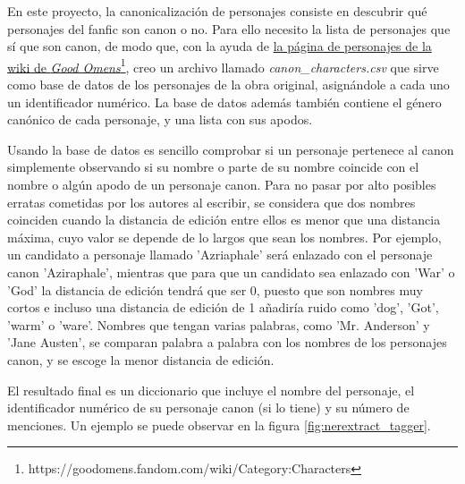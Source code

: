 \documentclass{pre-tfg}
\begin{document}
En este proyecto, la canonicalización de personajes consiste en descubrir qué personajes del fanfic son canon o no. Para ello necesito la lista de personajes que sí que son canon, de modo que, con la ayuda de \href{https://goodomens.fandom.com/wiki/Category:Characters}{la página de personajes de la wiki de \textit{Good Omens}}\footnote{https://goodomens.fandom.com/wiki/Category:Characters}, creo un archivo llamado \textit{canon\_characters.csv} que sirve como base de datos de los personajes de la obra original, asignándole a cada uno un identificador numérico. La base de datos además también contiene el género canónico de cada personaje, y una lista con sus apodos.

Usando la base de datos es sencillo comprobar si un personaje pertenece al canon simplemente observando si su nombre o parte de su nombre coincide con el nombre o algún apodo de un personaje canon. Para no pasar por alto posibles erratas cometidas por los autores al escribir, se considera que dos nombres coinciden cuando la distancia de edición \cite{levenshtein_1966} entre ellos es menor que una distancia máxima, cuyo valor se depende de lo largos que sean los nombres. Por ejemplo, un candidato a personaje llamado 'Azriaphale' será enlazado con el personaje canon 'Aziraphale', mientras que para que un candidato sea enlazado con 'War' o 'God' la distancia de edición tendrá que ser 0, puesto que son nombres muy cortos e incluso una distancia de edición de 1 añadiría ruido como 'dog', 'Got', 'warm' o 'ware'. Nombres que tengan varias palabras, como 'Mr. Anderson' y 'Jane Austen', se comparan palabra a palabra con los nombres de los personajes canon, y se escoge la menor distancia de edición.

El resultado final es un diccionario que incluye el nombre del personaje, el identificador numérico de su personaje canon (si lo tiene) y su número de menciones. Un ejemplo se puede observar en la figura \ref{fig:nerextract_tagger}.
\end{document}
